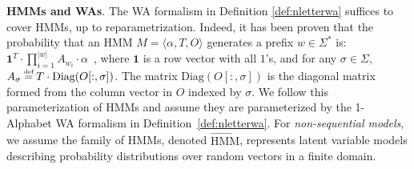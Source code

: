 \textbf{HMMs and WAs}. The WA formalism in Definition \ref{def:nletterwa}  suffices to cover HMMs, up to reparametrization.  Indeed, it has been proven that the probability that an HMM $M=\langle\alpha, T, O\rangle$ generates a prefix $w \in \Sigma^{*}$ is: $\mathbf{1}^{T} \cdot \prod\limits_{i=1}^{|w|} A_{w_{i}} \cdot \alpha$~\citep{hsu12}, where $\mathbf{1}$ is a row vector with all $1$'s, and for any $\sigma \in \Sigma$, $A_{\sigma} \myeq T \cdot \text{Diag}(O[:,\sigma])$. The matrix $\text{Diag}(O[:, \sigma])$ is the diagonal matrix formed from the column vector in $O$ indexed by $\sigma$. We follow this parameterization of HMMs and assume they are parameterized by the 1-Alphabet WA formalism in Definition~\ref{def:nletterwa}. For \emph{non-sequential models}, we assume the family of HMMs, denoted $\overrightarrow{\text{HMM}}$, represents latent variable models describing probability distributions over random vectors in a finite domain.




  


